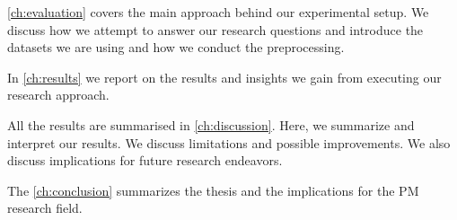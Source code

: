 \documentclass[./../../paper.tex]{subfiles}
\begin{document}
    \autoref{ch:evaluation} covers the main approach behind our experimental setup. We discuss how we attempt to answer our research questions and introduce the datasets we are using and how we conduct the preprocessing. 

    In \autoref{ch:results} we report on the results and insights we gain from executing our research approach. 
    
    All the results are summarised in \autoref{ch:discussion}. Here, we summarize and interpret our results. We discuss limitations and possible improvements. We also discuss implications for future research endeavors. 

    The \autoref{ch:conclusion} summarizes the thesis and the implications for the \Gls{PM} research field.
    
\end{document}
